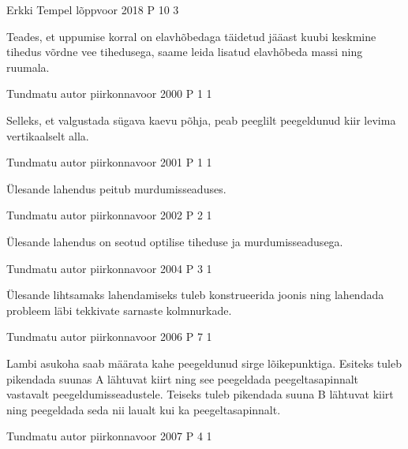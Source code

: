 \documentclass[11pt]{article}
\begin{document}
{%
{Erkki Tempel} %
{lõppvoor} %
{2018} %
{P 10} %
{3} %
{

\ifHint
Teades, et uppumise korral on elavhõbedaga täidetud jääast kuubi keskmine tihedus võrdne vee tihedusega, saame leida lisatud elavhõbeda massi ning ruumala.
\fi
}

{Tundmatu autor} %
{piirkonnavoor} %
{2000} %
{P 1} %
{1} %
{

\ifHint
Selleks, et valgustada sügava kaevu põhja, peab peeglilt peegeldunud kiir levima vertikaalselt alla.
\fi
}

{Tundmatu autor} %
{piirkonnavoor} %
{2001} %
{P 1} %
{1} %
{

\ifHint
Ülesande lahendus peitub murdumisseaduses.
\fi
}

{Tundmatu autor} %
{piirkonnavoor} %
{2002} %
{P 2} %
{1} %
{

\ifHint
Ülesande lahendus on seotud optilise tiheduse ja murdumisseadusega.
\fi
}
 
 



{Tundmatu autor} %
{piirkonnavoor} %
{2004} %
{P 3} %
{1} %
{

\ifHint
Ülesande lihtsamaks lahendamiseks tuleb konstrueerida joonis ning lahendada probleem läbi tekkivate sarnaste kolmnurkade.
\fi
}

{Tundmatu autor} %
{piirkonnavoor} %
{2006} %
{P 7} %
{1} %
{

\ifHint
Lambi asukoha saab määrata kahe peegeldunud sirge lõikepunktiga. Esiteks tuleb pikendada suunas A lähtuvat kiirt ning see peegeldada peegeltasapinnalt vastavalt peegeldumisseadustele. Teiseks tuleb pikendada suuna B lähtuvat kiirt ning peegeldada seda nii laualt kui ka peegeltasapinnalt.
\fi
}


{Tundmatu autor} %
{piirkonnavoor} %
{2007} %
{P 4} %
{1} %
{

}}
\end{document}
